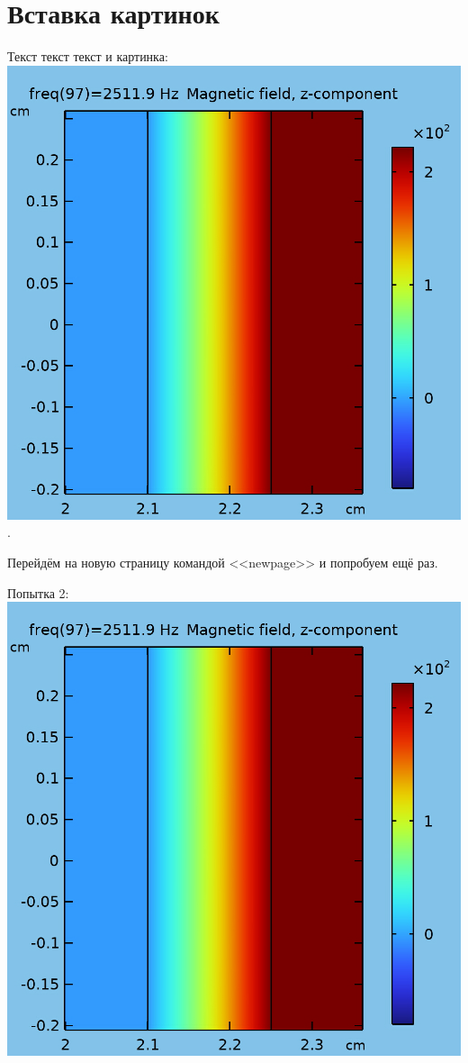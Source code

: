 \documentclass[a4paper, 12pt]{article}
\begin{document}
\section{Вставка картинок}
Текст текст текст и картинка: 
\includegraphics{09_out_img.png}. %

Перейдём на новую страницу командой <<newpage>> и попробуем ещё раз.

\newpage

Попытка 2: 
\includegraphics[scale=0.3]{09_out_img.png}
\end{document}

